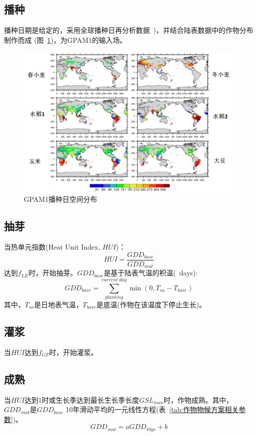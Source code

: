 \subsection{播种}\label{sec:播种}
  播种日期是给定的，采用全球播种日再分析数据~\citep{jagermeyr2021climate})，并结合陆表数据中的作物分布制作而成 (图~\ref{fig:GPAM1播种日空间分布})，为GPAM1的输入场。

{
\begin{figure}[htbp]
\centering
\includegraphics[scale=1.2]{Figures/作物模式/GPAM1播种日空间分布.png}
\caption{GPAM1播种日空间分布}
\label{fig:GPAM1播种日空间分布}
\end{figure}
}

\subsection{抽芽}
  当热单元指数(Heat Unit Index, $HUI$)：
  \begin{equation}\label{HUI}
  HUI=\frac{GDD_{base}}{GDD_{mat}}
  \end{equation}
  达到$f_{LE}$时，开始抽芽。$GDD_{base}$是基于陆表气温的积温(\textcelsius\ days):
  \begin{equation}
  GDD_{ {base }}=\sum_{planting}^{current\ day} \min \left(0, T_{sa}-T_{base}\right)
  \end{equation}
 其中，$T_{sa}$是日地表气温，$T_{base}$是底温(作物在该温度下停止生长)。
  
\subsection{灌浆}
  当$HUI$达到$f_{GF}$时，开始灌浆。

\subsection{成熟}
  当$HUI$达到1时或生长季达到最长生长季长度$GSL_{max}$时，作物成熟。其中，$GDD_{mat}$是$GDD_{base}$ 
  10年滑动平均的一元线性方程(表~\ref{tab:作物物候方案相关参数})。
  \begin{equation}
    GDD_{mat}=a GDD_{10yr}+b
  \end{equation}
  
